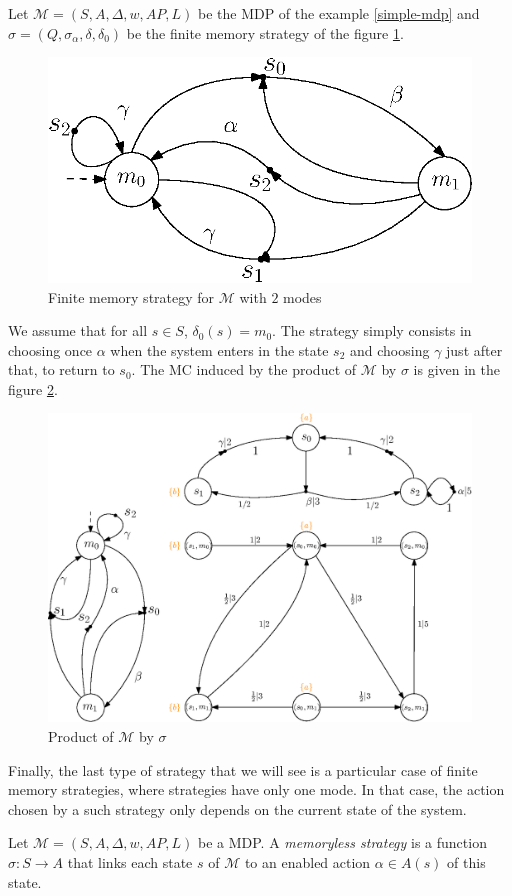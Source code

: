 \begin{example}
  Let $\mathcal{M}=(S, A, \Delta, w, AP, L)$ be the MDP of the example \ref{simple-mdp} and $\sigma = (Q, \sigma_\alpha, \delta, \delta_0)$ be the
  finite memory strategy of the figure \ref{finite_mem_strat}.
  \begin{figure}[h!]
    \centering
    \includegraphics[width=0.4\linewidth]{resources/strategy}
    \caption{Finite memory strategy for $\mathcal{M}$ with $2$ modes}\label{finite_mem_strat}
  \end{figure}

  We assume that for all $s \in S$, $\delta_0(s) = m_0$. The strategy simply consists in choosing once $\alpha$ when the system enters in the state $s_2$ and choosing $\gamma$ just after that, to return to $s_0$. The MC induced by the product of $\mathcal{M}$ by $\sigma$ is given in the figure
  \ref{inducedMC}.
  \begin{figure}[H]
    \centering
    \includegraphics[width=0.55\linewidth]{resources/inductedmarkov}
    \caption{Product of $\mathcal{M}$ by $\sigma$}\label{inducedMC}
  \end{figure}
\end{example}

Finally, the last type of strategy that we will see is a particular case of finite memory strategies, where strategies have only one mode.
In that case, the action chosen by a such strategy only depends on the current state of the system.

\begin{definition}
  Let $\mathcal{M}=(S, A, \Delta, w, AP, L)$ be a MDP. A \textit{memoryless strategy} is a function
  $
    \sigma: S \rightarrow A
  $ that links each state $s$ of $\mathcal{M}$ to an enabled action $\alpha \in A(s)$ of this state.
\end{definition}

